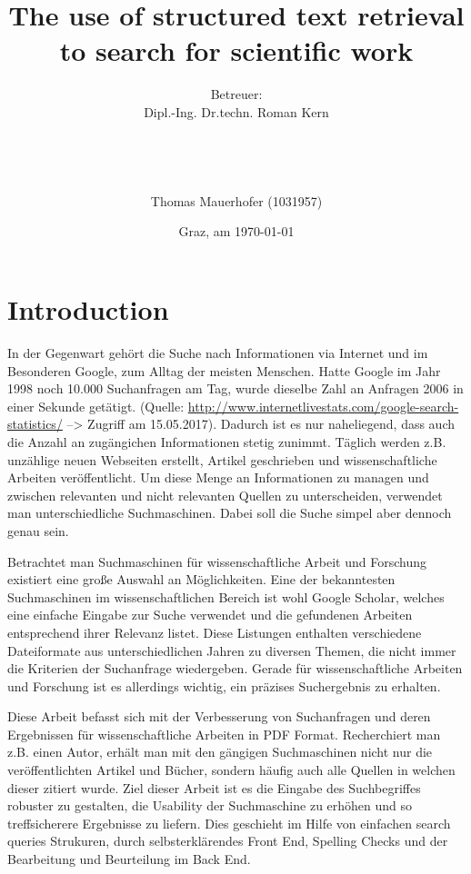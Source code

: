 \documentclass[a4paper, 12pt]{scrartcl}
\title{The use of structured text retrieval to search for scientific work}
\author{Betreuer: \\
Dipl.-Ing. Dr.techn. Roman Kern \\ \\ \\ \\ \\
Thomas Mauerhofer (1031957)}
\date{Graz, am \today{}}
\begin{document}
 \maketitle
 
\newpage

\tableofcontents

\newpage

\section{Introduction}
\label{sec:Introduction}

In der Gegenwart gehört die Suche nach Informationen via Internet und im Besonderen Google, zum Alltag der meisten Menschen. Hatte Google im Jahr 1998 noch 10.000 Suchanfragen am Tag, wurde dieselbe Zahl 
an Anfragen 2006 in einer Sekunde getätigt. (Quelle: \url{http://www.internetlivestats.com/google-search-statistics/} --> Zugriff am 15.05.2017). Dadurch ist es nur naheliegend, dass auch die Anzahl an zugängichen
Informationen stetig zunimmt. Täglich werden z.B. unzählige neuen Webseiten erstellt, Artikel geschrieben und wissenschaftliche Arbeiten veröffentlicht. Um
diese Menge an Informationen zu managen und zwischen relevanten und nicht relevanten Quellen zu unterscheiden, verwendet man unterschiedliche Suchmaschinen. 
Dabei soll die Suche simpel aber dennoch genau sein.

Betrachtet man Suchmaschinen für wissenschaftliche Arbeit und Forschung existiert eine große Auswahl an Möglichkeiten. Eine der bekanntesten Suchmaschinen im wissenschaftlichen Bereich ist wohl Google
Scholar, welches eine einfache Eingabe zur Suche verwendet und die gefundenen Arbeiten entsprechend ihrer Relevanz listet. Diese Listungen enthalten verschiedene Dateiformate aus unterschiedlichen Jahren zu 
diversen Themen, die nicht immer die Kriterien der Suchanfrage wiedergeben. Gerade für wissenschaftliche Arbeiten und Forschung ist es allerdings wichtig, ein präzises Suchergebnis zu erhalten. 

Diese Arbeit befasst sich mit der Verbesserung von Suchanfragen und deren Ergebnissen für wissenschaftliche Arbeiten in PDF Format. Recherchiert man z.B. einen Autor, erhält man mit den gängigen Suchmaschinen
nicht nur die veröffentlichten Artikel und Bücher, sondern häufig auch alle Quellen in welchen dieser zitiert wurde. Ziel dieser Arbeit ist es die Eingabe des Suchbegriffes robuster zu gestalten, die 
Usability der Suchmaschine zu erhöhen und so treffsicherere Ergebnisse zu liefern. Dies geschieht im Hilfe von einfachen search queries Strukuren, durch selbsterklärendes Front End, Spelling Checks und 
der Bearbeitung und Beurteilung im Back End. 
\end{document}
